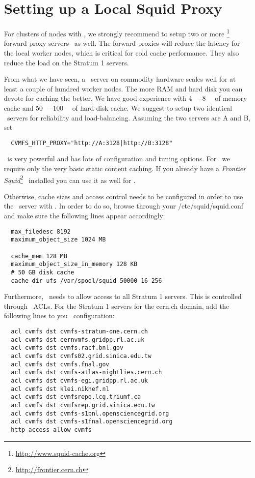\chapter{Setting up a Local Squid Proxy}
\label{sct:squid}

For clusters of nodes with \cvmfs, we strongly recommend to setup two or more \squid\footnote{\url{http://www.squid-cache.org}} forward proxy servers~\cite{squid99, bloomsquid00} as well.
The forward proxies will reduce the latency for the local worker nodes, which is critical for cold cache performance. 
They also reduce the load on the Stratum 1 servers.

From what we have seen, a \squid\ server on commodity hardware scales well for at least a couple of hundred worker nodes.
The more RAM and hard disk you can devote for caching the better.
We have good experience with \SIrange{4}{8}{\giga\byte} of memory cache and \SIrange{50}{100}{\giga\byte} of hard disk cache.
We suggest to setup two identical \squid\ servers for reliability and load-balancing.
Assuming the two servers are A and B, set
\begin{verbatim}
  CVMFS_HTTP_PROXY="http://A:3128|http://B:3128"
\end{verbatim}

\squid\ is very powerful and has lots of configuration and tuning options.
For \cvmfs\ we require only the very basic static content caching.
If you already have a \emph{Frontier Squid}\footnote{\url{http://frontier.cern.ch}}~\cite{frontier08, frontier10} installed you can use it as well for \cvmfs.

Otherwise, cache sizes and access control needs to be configured in order to use the \squid\ server with \cvmfs.
In order to do so, browse through your /etc/squid/squid.conf and make sure the following lines appear accordingly:
\begin{verbatim}
  max_filedesc 8192
  maximum_object_size 1024 MB

  cache_mem 128 MB
  maximum_object_size_in_memory 128 KB
  # 50 GB disk cache
  cache_dir ufs /var/spool/squid 50000 16 256
\end{verbatim}

Furthermore, \squid\ needs to allow access to all Stratum 1 servers.
This is controlled through \squid\ ACLs.
For the Stratum 1 servers for the cern.ch domain, add the following lines to you \squid\ configuration:
\begin{verbatim}
  acl cvmfs dst cvmfs-stratum-one.cern.ch
  acl cvmfs dst cernvmfs.gridpp.rl.ac.uk
  acl cvmfs dst cvmfs.racf.bnl.gov
  acl cvmfs dst cvmfs02.grid.sinica.edu.tw
  acl cvmfs dst cvmfs.fnal.gov
  acl cvmfs dst cvmfs-atlas-nightlies.cern.ch
  acl cvmfs dst cvmfs-egi.gridpp.rl.ac.uk
  acl cvmfs dst klei.nikhef.nl
  acl cvmfs dst cvmfsrepo.lcg.triumf.ca
  acl cvmfs dst cvmfsrep.grid.sinica.edu.tw
  acl cvmfs dst cvmfs-s1bnl.opensciencegrid.org
  acl cvmfs dst cvmfs-s1fnal.opensciencegrid.org
  http_access allow cvmfs
\end{verbatim}

